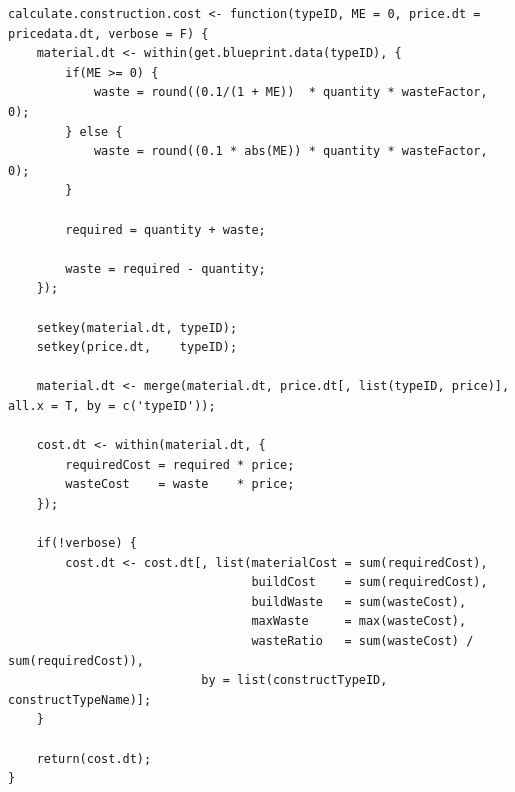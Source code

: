 \documentclass[12pt]{beamer}
\begin{document}
\begin{frame}[fragile]
\begin{verbatim}
calculate.construction.cost <- function(typeID, ME = 0, price.dt = pricedata.dt, verbose = F) {
    material.dt <- within(get.blueprint.data(typeID), {
        if(ME >= 0) {
            waste = round((0.1/(1 + ME))  * quantity * wasteFactor, 0);
        } else {
            waste = round((0.1 * abs(ME)) * quantity * wasteFactor, 0);
        }

        required = quantity + waste;

        waste = required - quantity;
    });

    setkey(material.dt, typeID);
    setkey(price.dt,    typeID);

    material.dt <- merge(material.dt, price.dt[, list(typeID, price)], all.x = T, by = c('typeID'));

    cost.dt <- within(material.dt, {
        requiredCost = required * price;
        wasteCost    = waste    * price;
    });

    if(!verbose) {
        cost.dt <- cost.dt[, list(materialCost = sum(requiredCost),
                                  buildCost    = sum(requiredCost),
                                  buildWaste   = sum(wasteCost),
                                  maxWaste     = max(wasteCost),
                                  wasteRatio   = sum(wasteCost) / sum(requiredCost)),
                           by = list(constructTypeID, constructTypeName)];
    }

    return(cost.dt);
}
\end{verbatim}
\end{frame}
\end{document}
